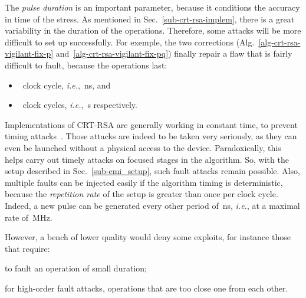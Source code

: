 \documentclass[10pt]{article}
\theoremstyle{definition}
\theoremstyle{theorem}
\newcommand{\ie}{\textit{i.e.}}
\begin{document}
The \emph{pulse duration} is an important parameter, because it conditions the accuracy in time of the stress.
As mentioned in Sec.~\ref{sub-crt-rsa-implem}, there is a great variability in the duration of the operations.
Therefore, some attacks will be more difficult to set up successfully.
For exemple, the two corrections (Alg.~\ref{alg-crt-rsa-vigilant-fix-p} and~\ref{alg-crt-rsa-vigilant-fix-pq}) finally repair a flaw that is fairly difficult to fault,
because the operations last:
\begin{itemize}
\item ~clock cycle, \ie, \,ns, and
\item ~clock cycles, \ie, \,s respectively.
\end{itemize}

Implementations of CRT-RSA are generally working in constant time, to prevent timing attacks~\cite{kocher-timing_attacks}.
Those attacks are indeed to be taken very seriously, as they can even be launched without a physical access to the device.
Paradoxically, this helps carry out timely attacks on focused stages in the algorithm.
So, with the setup described in Sec.~\ref{sub-emi_setup}, such fault attacks remain possible.
Also, multiple faults can be injected easily if the algorithm timing is deterministic,
because the \emph{repetition rate} of the setup is greater than once per clock cycle.
Indeed, a new pulse can be generated every other period of \,ns, \ie, at a maximal rate of \,MHz.

However, a bench of lower quality would deny some exploits, for instance those that require:
\begin{inparaenum}
\item to fault an operation of small duration;
\item for high-order fault attacks, operations that are too close one from each other.
\end{inparaenum}
\end{document}
